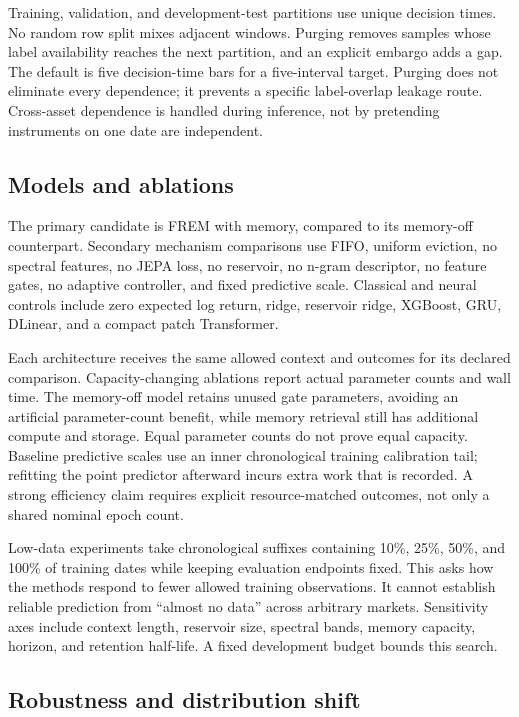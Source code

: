 \documentclass[11pt,a4paper]{article}
\begin{document}
Training, validation, and development-test partitions use unique decision times. No random row split mixes adjacent windows. Purging removes samples whose label availability reaches the next partition, and an explicit embargo adds a gap. The default is five decision-time bars for a five-interval target. Purging does not eliminate every dependence; it prevents a specific label-overlap leakage route. Cross-asset dependence is handled during inference, not by pretending instruments on one date are independent.

\subsection{Models and ablations}

The primary candidate is FREM with memory, compared to its memory-off counterpart. Secondary mechanism comparisons use FIFO, uniform eviction, no spectral features, no JEPA loss, no reservoir, no n-gram descriptor, no feature gates, no adaptive controller, and fixed predictive scale. Classical and neural controls include zero expected log return, ridge, reservoir ridge, XGBoost, GRU, DLinear, and a compact patch Transformer.

Each architecture receives the same allowed context and outcomes for its declared comparison. Capacity-changing ablations report actual parameter counts and wall time. The memory-off model retains unused gate parameters, avoiding an artificial parameter-count benefit, while memory retrieval still has additional compute and storage. Equal parameter counts do not prove equal capacity. Baseline predictive scales use an inner chronological training calibration tail; refitting the point predictor afterward incurs extra work that is recorded. A strong efficiency claim requires explicit resource-matched outcomes, not only a shared nominal epoch count.

Low-data experiments take chronological suffixes containing 10\%, 25\%, 50\%, and 100\% of training dates while keeping evaluation endpoints fixed. This asks how the methods respond to fewer allowed training observations. It cannot establish reliable prediction from ``almost no data'' across arbitrary markets. Sensitivity axes include context length, reservoir size, spectral bands, memory capacity, horizon, and retention half-life. A fixed development budget bounds this search.

\subsection{Robustness and distribution shift}
\end{document}
